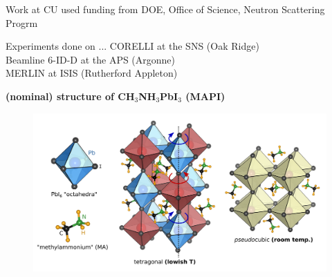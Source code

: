 \documentclass[12pt]{beamer}
\begin{document}
{\begin{frame}
\vspace{-0.5cm}
\centering
Work at CU used funding from DOE, Office of Science, Neutron Scattering Progrm

\vspace{0.5cm}
\begin{block}{Experiments done on ...}
CORELLI at the SNS (Oak Ridge) \\
Beamline 6-ID-D at the APS (Argonne) \\
MERLIN at ISIS (Rutherford Appleton)
\end{block}
\end{frame}

}


\begin{frame} %

\textbf{(nominal) structure of CH$_3$NH$_3$PbI$_3$ (MAPI)}

\vspace{0.5cm}
\begin{figure}
    \includegraphics[width=1.0\linewidth]{figs/struct.png}
\end{figure}
\end{frame}

\end{document}
